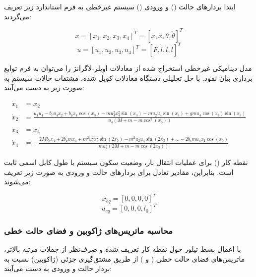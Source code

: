 ابتدا بردارهای حالت () و ورودی () سیستم غیرخطی به فرم استاندارد زیر تعریف می‌گردند:

\begin{equation}
    x = [x_1, x_2, x_3, x_4]^T = [x, \dot{x}, \theta, \dot{\theta}]^T
\end{equation}
\begin{equation}
    u = [u_1, u_2, u_3, u_4]^T = [F, \ddot{l}, \dot{l}, l]^T
\end{equation}

مدل دینامیکی غیرخطی استخراج شده از معادلات اویلر-لاگرانژ را می‌توان به فرم توابع برداری  بیان نمود. با حل تحلیلی دستگاه معادلات کوپل شده، مشتقات حالات سیستم به صورت زیر به دست می‌آیند:

\begin{align}
    \dot{x}_1 & = x_2                                                                                                                                                         \\
    \dot{x}_2 & = \frac{u_1 u_4 - b_c u_4 x_2 + b_p x_4 \cos(x_3) - m u_4^2 x_4^2 \sin(x_3) - m u_2 u_4 \sin(x_3) + g m u_4 \cos(x_3) \sin(x_3)}{u_4 (M + m - m \cos^2(x_3))} \\
    \dot{x}_3 & = x_4                                                                                                                                                         \\
    \dot{x}_4 & = -\frac{2M b_p x_4 + 2b_p m x_4 + m^2 u_4^2 x_4^2 \sin(2x_3) - m^2 u_2 u_4 \sin(2x_3) + \dots - 2b_c m u_4 x_2 \cos(x_3)}{m u_4^2 (2M + m - m \cos(2x_3))}
\end{align}

نقطه کار () برای عملیات انتقال بار، وضعیت سکون سیستم با طول کابل اسمی ثابت است. بنابراین، مقادیر تعادل برای بردارهای حالت و ورودی به صورت زیر تعریف می‌شوند:

\begin{equation}
    x_{eq} = [0, 0, 0, 0]^T
\end{equation}
\begin{equation}
    u_{eq} = [0, 0, 0, l_0]^T
\end{equation}

\subsubsection{محاسبه ماتریس‌های ژاکوبین و فضای حالت خطی}

با اعمال بسط تیلور حول نقطه کار تعریف شده و صرف‌نظر از جملات مرتبه بالاتر، ماتریس‌های فضای حالت خطی ( و ) از طریق مشتق‌گیری جزئی (ژاکوبین) نسبت به بردار حالت و ورودی به دست می‌آیند:

